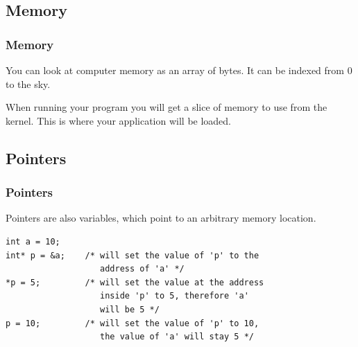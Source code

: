 \documentclass[
	11pt, %
]{beamer}
\begin{document}
\begin{frame}
    \subsection{Memory}
	\frametitle{Memory}

    You can look at computer memory as an array of bytes. It can be indexed from 0 to the sky.

    \bigskip

    When running your program you will get a slice of memory to use from the kernel.
    This is where your application will be loaded.

\end{frame}

\begin{frame}[fragile]
    \subsection{Pointers}
	\frametitle{Pointers}

    Pointers are also variables, which point to an arbitrary memory location.

    \bigskip

    \begin{lstlisting}[style=CStyle]
int a = 10;
int* p = &a;    /* will set the value of 'p' to the
                   address of 'a' */
*p = 5;         /* will set the value at the address
                   inside 'p' to 5, therefore 'a'
                   will be 5 */
p = 10;         /* will set the value of 'p' to 10,
                   the value of 'a' will stay 5 */

\end{lstlisting}
\end{frame}
\end{document}
